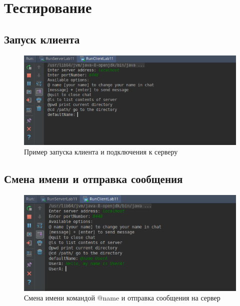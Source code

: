 \documentclass{article}
\begin{document}
\section{Тестирование}

\subsection{Запуск клиента}
\begin{figure}[H]
	\begin{flushleft}
		\centerline{\includegraphics[scale=0.65]{clientload.png}}
		\caption{Пример запуска клиента и подключения к серверу}
	\end{flushleft}
\end{figure}

\subsection{Смена имени и отправка сообщения}
\begin{figure}[H]
	\begin{flushleft}
		\centerline{\includegraphics[scale=0.7]{nameandsend.png}}
		\caption{Смена имени командой @name и отправка сообщения на сервер}
	\end{flushleft}
\end{figure}
\end{document}
